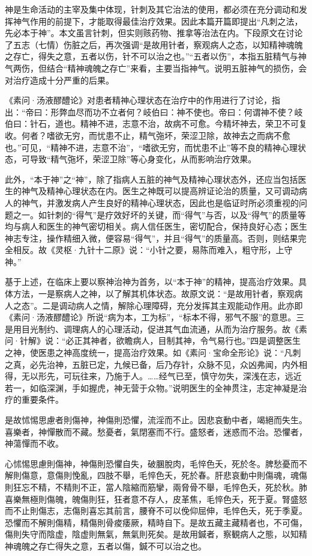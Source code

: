 \documentclass[12pt]{ctexbook}
\begin{document}
神是生命活动的主宰及集中体现，针刺及其它治法的使用，都必须在充分调动和发挥神气作用的前提下，才能取得最佳治疗效果。因此本篇开篇即提出“凡刺之法，先必本于神”。本文虽言针刺，但实则赅药物、推拿等治法在内。下段原文在讨论了五志（七情）伤脏之后，再次强调“是故用针者，察观病人之态，以知精神魂魄之存亡，得失之意，五者以伤，针不可以治之也。”“五者以伤”，本指五脏精气与神气两伤，但结合“精神魂魄之存亡”来看，主要当指神气。说明五脏神气的损伤，会对治疗造成十分严重的后果。

《素问·汤液醪醴论》对患者精神心理状态在治疗中的作用进行了讨论，指出：“帝曰：形弊血尽而功不立者何？岐伯曰：神不使也。帝曰：何谓神不使？岐伯曰：针石，道也。精神不进，志意不治，故病不可愈。今精坏神去，荣卫不可复收。何者？嗜欲无穷，而忧患不止，精气㢮坏，荣涩卫除，故神去之而病不愈也。”可见，“精神不进，志意不治”，“嗜欲无穷，而忧患不止”等不良的精神心理状态，可导致“精气㢮坏，荣涩卫除”等心身变化，从而影响治疗效果。

此外，“本于神”之“神”，除了指病人五脏的神气及精神心理状态外，还应当包括医生的神气及精神心理状态在内。医生之神既可以提高辨证论治的质量，又可调动病人的神气，并激发病人产生良好的精神心理状态，因此也是临证时所必须重视的问题之一。如针刺的“得气”是疗效好坏的关键，而“得气”与否，以及“得气”的质量等均与病人和医生的神气密切相关。病人信任医生，密切配合，保持良好心态；医生神志专注，操作精细入微，便容易“得气”，并且“得气”的质量高。否则，则结果完全相反。故《灵枢·九针十二原》说：“小针之要，易陈而难入，粗守形，上守神。”

基于上述，在临床上要以察神治神为首务，以“本于神”的精神，提高治疗效果。具体方法，一是察病人之神，以了解其机体状态。故原文说：“是故用针者，察观病人之态”。二是调动病人之情，解除心理障碍，充分发挥其主观能动作用。此亦即《素问·汤液醪醴论》所说“病为本，工为标”，“标本不得，邪气不服”的意思。三是用目光制约、调理病人的心理活动，促进其气血流通，从而为治疗服务。故《素问·针解》说：“必正其神者，欲瞻病人，目制其神，令气易行也。”四是调整医生之神，使医患之神高度统一，提高治疗效果。如《素问·宝命全形论》说：“凡刺之真，必先治神，五脏已定，九候已备，后乃存针，众脉不见，众凶弗闻，内外相得，无以形先，可玩往来，乃施于人。……经气已至，慎守勿失，深浅在志，远近若一，如临深渊，手如握虎，神无营于众物。”说明医生的全神贯注，志定神凝是治疗的重要条件。


\begin{yuanwen}
是故怵惕思慮者則傷神，神傷則恐懼，流淫而不止。因悲哀動中者，竭絕而失生。喜樂者，神憚散而不藏。愁憂者，氣閉塞而不行。盛怒者，迷惑而不治。恐懼者，神蕩憚而不收。

心怵惕思慮則傷神，神傷則恐懼自失，破䐃脫肉，毛悴色夭，死於冬。脾愁憂而不解則傷意，意傷則悗亂，四肢不舉，毛悴色夭，死於春。肝悲哀動中則傷魂，魂傷則狂忘不精，不精則不正，當人陰縮而筋攣，兩脅骨不舉，毛悴色夭，死於秋。肺喜樂無極則傷魄，魄傷則狂，狂者意不存人，皮革焦，毛悴色夭，死于夏。腎盛怒而不止則傷志，志傷則喜忘其前言，腰脊不可以俛仰屈伸，毛悴色夭，死于季夏。恐懼而不解則傷精，精傷則骨痠痿厥，精時自下。是故五藏主藏精者也，不可傷，傷則失守而陰虚，陰虚則無氣，無氣則死矣。是故用鍼者，察観病人之態，以知精神魂魄之存亡得失之意，五者以傷，鍼不可以治之也。
\end{yuanwen}
\end{document}
